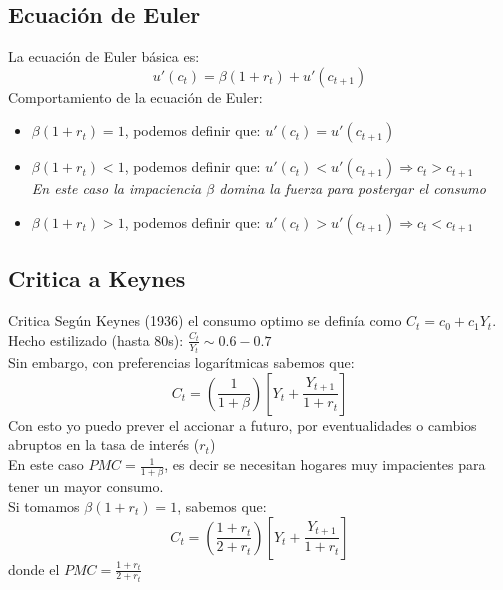 \documentclass[12pt]{article}
\begin{document}
\subsection{Ecuación de Euler}
La ecuación de Euler básica es: 
$$u'(c_t)=\beta(1+r_t)+u'(c_{t+1})$$
Comportamiento de la ecuación de Euler: 
\begin{itemize}
    \item $\beta(1+r_t)=1$, podemos definir que: $u'(c_t)=u'(c_{t+1})$
    \item $\beta(1+r_t)<1$, podemos definir que: $u'(c_t)<u'(c_{t+1})\Rightarrow{} c_t>c_{t+1}$ \\\textit{En este caso la impaciencia $\beta$ domina la fuerza para postergar el consumo}
    \item $\beta(1+r_t)>1$, podemos definir que: $u'(c_t)>u'(c_{t+1})\Rightarrow{} c_t<c_{t+1}$
\end{itemize}

\subsection{Critica a Keynes}
\begin{comentarioprofe}{Critica}
    Según Keynes (1936) el consumo optimo se definía como $C_t=c_0+c_1Y_t$. \\
    Hecho estilizado (hasta 80s): $\frac{C_t}{Y_t} \sim 0.6-0.7$ \\
    Sin embargo, con preferencias logarítmicas sabemos que: 
    $$C_t=(\frac{1}{1+\beta})[Y_t+\frac{Y_{t+1}}{1+r_t}]$$
    Con esto yo puedo prever el accionar a futuro, por eventualidades o cambios abruptos en la tasa de interés ($r_t$)\\ 
    En este caso $PMC=\frac{1}{1+\beta}$, es decir se necesitan hogares muy impacientes para tener un mayor consumo. \\
    Si tomamos $\beta(1+r_t)=1$, sabemos que: 
    $$C_t=(\frac{1+r_t}{2+r_t})[Y_t+\frac{Y_{t+1}}{1+r_t}]$$ 
    donde el $PMC=\frac{1+r_t}{2+r_t}$
\end{comentarioprofe}
\end{document}
